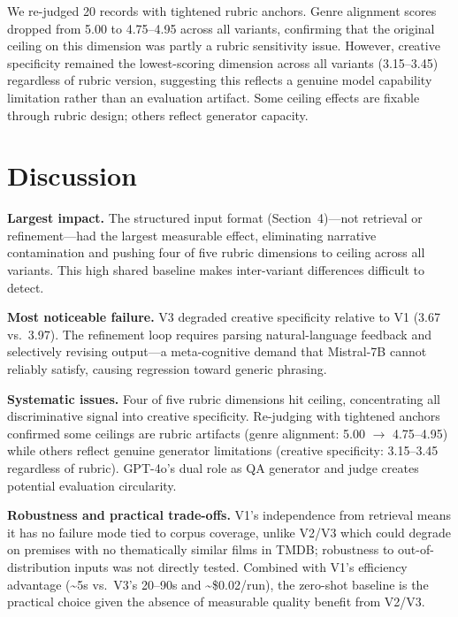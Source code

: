 \documentclass[10pt,twocolumn]{article}
\begin{document}
We re-judged 20 records with tightened rubric anchors. Genre alignment scores dropped from 5.00 to 4.75--4.95 across all variants, confirming that the original ceiling on this dimension was partly a rubric sensitivity issue. However, creative specificity remained the lowest-scoring dimension across all variants (3.15--3.45) regardless of rubric version, suggesting this reflects a genuine model capability limitation rather than an evaluation artifact. Some ceiling effects are fixable through rubric design; others reflect generator capacity.

\section{Discussion}
\label{sec:discussion}

\textbf{Largest impact.} The structured input format (Section~4)---not retrieval or refinement---had the largest measurable effect, eliminating narrative contamination and pushing four of five rubric dimensions to ceiling across all variants. This high shared baseline makes inter-variant differences difficult to detect.

\textbf{Most noticeable failure.} V3 degraded creative specificity relative to V1 (3.67 vs.\ 3.97). The refinement loop requires parsing natural-language feedback and selectively revising output---a meta-cognitive demand that Mistral-7B cannot reliably satisfy, causing regression toward generic phrasing.

\textbf{Systematic issues.} Four of five rubric dimensions hit ceiling, concentrating all discriminative signal into creative specificity. Re-judging with tightened anchors confirmed some ceilings are rubric artifacts (genre alignment: 5.00 $\to$ 4.75--4.95) while others reflect genuine generator limitations (creative specificity: 3.15--3.45 regardless of rubric). GPT-4o's dual role as QA generator and judge creates potential evaluation circularity.

\textbf{Robustness and practical trade-offs.} V1's independence from retrieval means it has no failure mode tied to corpus coverage, unlike V2/V3 which could degrade on premises with no thematically similar films in TMDB; robustness to out-of-distribution inputs was not directly tested. Combined with V1's efficiency advantage (\textasciitilde5s vs.\ V3's 20--90s and \textasciitilde\$0.02/run), the zero-shot baseline is the practical choice given the absence of measurable quality benefit from V2/V3.
\end{document}
